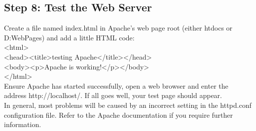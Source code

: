 \subsection*{Step 8: Test the Web Server }
Create a file named index.html in Apache's web page root (either htdocs or D:WebPages) and add a little HTML code:\\
<html>\\
<head><title>testing Apache</title></head>\\
<body><p>Apache is working!</p></body>\\
</html>\\
Ensure Apache has started successfully, open a web browser and enter the address http://localhost/. If all goes well, your test page should appear.\\
In general, most problems will be caused by an incorrect setting in the httpd.conf configuration file. Refer to the Apache documentation if you require further information.

